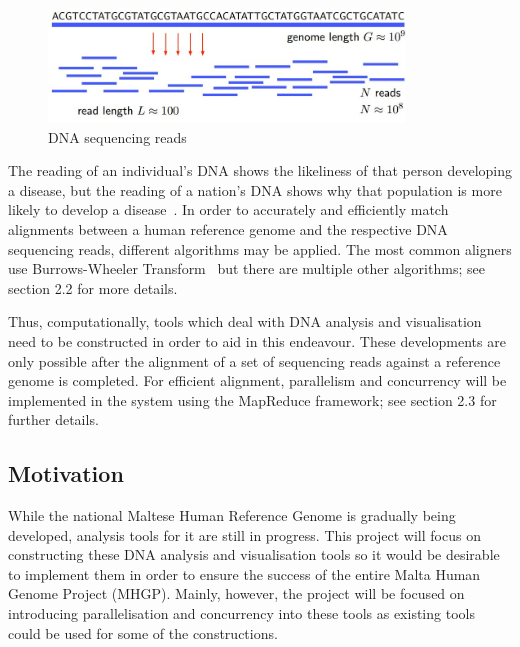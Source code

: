 \documentclass{csfyp}
\begin{document}
\begin{small}
\begin{figure}[h!]
  \includegraphics[width=\linewidth, height=115]{dnareads.jpg}
  \caption{DNA sequencing reads}
  \label{fig:reads}
\end{figure}

The reading of an individual's DNA shows the likeliness of that person developing a disease, but the reading of a nation’s DNA shows why that population is more likely to develop a disease~\cite{think}.  In order to accurately and efficiently match alignments between a human reference genome and the respective DNA sequencing reads, different algorithms may be applied.  The most common aligners use Burrows-Wheeler Transform~\cite{bwtransform, cgreads} but there are multiple other algorithms; see section 2.2 for more details.  

Thus, computationally, tools which deal with DNA analysis and visualisation need to be constructed in order to aid in this endeavour.  These developments are only possible after the alignment of a set of sequencing reads against a reference genome is completed.  For efficient alignment, parallelism and concurrency will be implemented in the system using the MapReduce framework; see section 2.3 for further details.   

\subsection{Motivation}\vspace{-4ex}
While the national Maltese Human Reference Genome is gradually being developed, analysis tools for it are still in progress.  This project will focus on constructing these DNA analysis and visualisation tools so it would be desirable to implement them in order to ensure the success of the entire Malta Human Genome Project (MHGP).  Mainly, however, the project will be focused on introducing parallelisation and concurrency into these tools as existing tools could be used for some of the constructions.     


\end{small}
\end{document}
